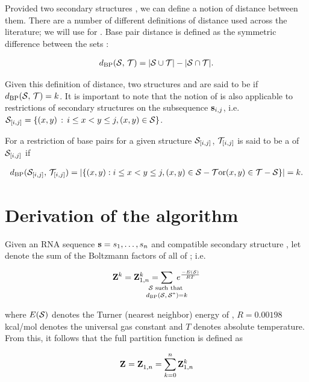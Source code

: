 Provided two secondary structures \strST, we can define a notion of
distance between them. There are a number of different definitions of distance
used across the literature; we will use {\em \bpd} for \fftbor.
Base pair distance is defined as the symmetric difference between the sets
\strST:

\begin{align}
\label{eq:fftbor:dBP}
\dBP{\str}{\strT} = |\str \cup \strT| - |\str \cap \strT|.
\end{align}

Given this definition of distance, two structures \str and \strT are said to
be \kNbrs if $d_{\text{BP}}(\mathcal S,\,\mathcal T) = k$. It is important to note that
the notion of \bpd is also applicable to restrictions of secondary structures
on the subsequence ${\bf s}_{i,j}$,
i.e. $\mathcal S_{[i,j]} = \{ (x,y) \,:\, i \leq  x < y \leq j,  (x,y) \in \mathcal S \}$.

For a restriction of base pairs for a given structure $\mathcal S_{[i,j]}$,
$\mathcal T_{[i,j]}$ is said to be a \kNbr of $\mathcal S_{[i,j]}$ if

\begin{align}
\label{eq:fftbor:dBPonRestriction}
\dBP{\str_{[i,j]}}{\strT_{[i,j]}} =
|\{ (x,y): i \leq x<y\leq j,
(x,y) \in \str - \strT \text{or} (x,y) \in \strT - \str \}| = k.
\end{align}

\section{Derivation of the \fftbor algorithm}
\label{sec:fftbor:math}

Given an RNA sequence ${\bf s}=s_1,\dots,s_n$ and compatible secondary structure
\strSt, let  denote the sum of the Boltzmann factors
\boltzf{\str} of all \kNbrs \str of \strSt; i.e.

\begin{align}
\bfZ{k}{} = \bfZ{k}{1,n} =
\sum_{\mathclap{\substack{\str \text{ such that } \rule[-.5ex]{0pt}{0pt} \\
 \dBP{\str}{\strSt}=k}}}\;
\boltzF{\str}
\end{align}

where $E(\mathcal S)$ denotes the Turner (nearest neighbor)
energy \citep{}
of \str, $R = 0.00198$ kcal/mol denotes the universal
gas constant and $T$ denotes absolute temperature. From this, it follows that
the full partition function is defined as

\begin{align}
\label{eq:fftbor:partFunc}
\fullZ = \bfZ{}{1,n} = \sum_{k=0}^n \bfZ{k}{1,n}
\end{align}

